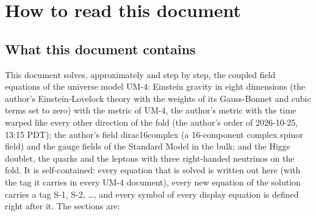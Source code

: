 \documentclass[
  10pt,
]{article}
\begin{document}
\hypertarget{how-to-read-this-document}{%
\section{How to read this document}\label{how-to-read-this-document}}

\hypertarget{what-this-document-contains}{%
\subsection{What this document
contains}\label{what-this-document-contains}}

This document solves, approximately and step by step, the coupled field
equations of the universe model UM-4: Einstein gravity in eight
dimensions (the author's Einstein-Lovelock theory with the weights of
its Gauss-Bonnet and cubic terms set to zero) with the metric of UM-4,
the author's metric with the time warped like every other direction of
the fold (the author's order of 2026-10-25, 13:15 PDT); the author's
field dirac16complex (a 16-component complex spinor field) and the gauge
fields of the Standard Model in the bulk; and the Higgs doublet, the
quarks and the leptons with three right-handed neutrinos on the fold. It
is self-contained: every equation that is solved is written out here
(with the tag it carries in every UM-4 document), every new equation of
the solution carries a tag S-1, S-2, \ldots, and every symbol of every
display equation is defined right after it. The sections are:
\end{document}
